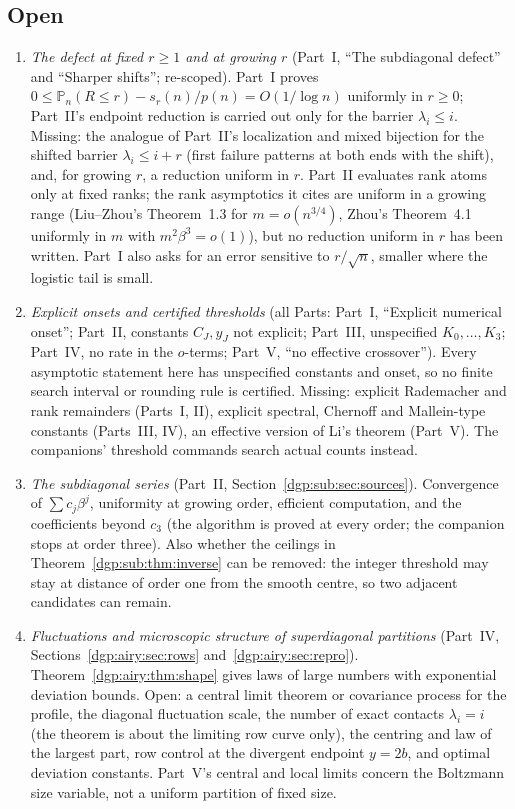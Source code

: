 \documentclass[11pt,letterpaper]{article}
\numberwithin{equation}{section}
\theoremstyle{remark}\newtheorem{remark}[theorem]{Remark}
\newcommand{\Prb}{\mathbb P}
\begin{document}
\subsection*{Open}
\begin{enumerate}
\item\label{dgp:q:defect} \emph{The defect at fixed $r\ge1$ and at growing $r$} (Part~I, ``The subdiagonal defect'' and ``Sharper shifts''; re-scoped). Part~I proves $0\le\Prb_n(R\le r)-s_r(n)/p(n)=O(1/\log n)$ uniformly in $r\ge0$; Part~II's endpoint reduction is carried out only for the barrier $\lambda_i\le i$. Missing: the analogue of Part~II's localization and mixed bijection for the shifted barrier $\lambda_i\le i+r$ (first failure patterns at both ends with the shift), and, for growing $r$, a reduction uniform in $r$. Part~II evaluates rank atoms only at fixed ranks; the rank asymptotics it cites are uniform in a growing range (Liu--Zhou's Theorem~1.3 for $m=o(n^{3/4})$, Zhou's Theorem~4.1 uniformly in $m$ with $m^2\beta^3=o(1)$), but no reduction uniform in $r$ has been written. Part~I also asks for an error sensitive to $r/\sqrt n$, smaller where the logistic tail is small.
\item\label{dgp:q:onset} \emph{Explicit onsets and certified thresholds} (all Parts: Part~I, ``Explicit numerical onset''; Part~II, constants $C_J,y_J$ not explicit; Part~III, unspecified $K_0,\dots,K_3$; Part~IV, no rate in the $o$-terms; Part~V, ``no effective crossover''). Every asymptotic statement here has unspecified constants and onset, so no finite search interval or rounding rule is certified. Missing: explicit Rademacher and rank remainders (Parts~I, II), explicit spectral, Chernoff and Mallein-type constants (Parts~III, IV), an effective version of Li's theorem (Part~V). The companions' threshold commands search actual counts instead.
\item\label{dgp:q:series} \emph{The subdiagonal series} (Part~II, Section~\ref{dgp:sub:sec:sources}). Convergence of $\sum c_j\beta^j$, uniformity at growing order, efficient computation, and the coefficients beyond $c_3$ (the algorithm is proved at every order; the companion stops at order three). Also whether the ceilings in Theorem~\ref{dgp:sub:thm:inverse} can be removed: the integer threshold may stay at distance of order one from the smooth centre, so two adjacent candidates can remain.
\item\label{dgp:q:fluct} \emph{Fluctuations and microscopic structure of superdiagonal partitions} (Part~IV, Sections~\ref{dgp:airy:sec:rows} and~\ref{dgp:airy:sec:repro}). Theorem~\ref{dgp:airy:thm:shape} gives laws of large numbers with exponential deviation bounds. Open: a central limit theorem or covariance process for the profile, the diagonal fluctuation scale, the number of exact contacts $\lambda_i=i$ (the theorem is about the limiting row curve only), the centring and law of the largest part, row control at the divergent endpoint $y=2b$, and optimal deviation constants. Part~V's central and local limits concern the Boltzmann size variable, not a uniform partition of fixed size.

\end{enumerate}
\end{document}
